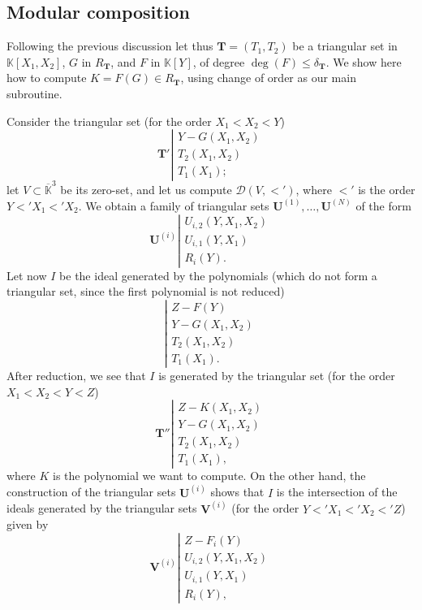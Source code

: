 \documentclass[12pt]{article}
\def\K {\ensuremath{\mathbb{K}}}
\def\Kbar {\ensuremath{\overline{\mathbb{K}}}}
\def\Tt {\ensuremath{\mathbf{T}}}
\def\Uu {\ensuremath{\mathbf{U}}}
\def\Vv {\ensuremath{\mathbf{V}}}
\def\Dr {\ensuremath{\mathscr D}}
\begin{document}
\subsection{Modular composition}



Following the previous discussion let thus $\Tt=(T_1,T_2)$ be a
triangular set in $\K[X_1,X_2]$, $G$ in $R_\Tt$, and $F$ in $\K[Y]$,
of degree $\deg(F) \le \delta_\Tt$. We show here how to compute
$K=F(G) \in R_\Tt$, using change of order as our main subroutine.

Consider the triangular set (for the order $X_1 < X_2< Y$)
\[
\Tt' \left |
  \begin{array}{l}
    Y-G(X_1,X_2)\\
    T_2(X_1,X_2)\\
    T_1(X_1);
  \end{array}\right .
\]
let $V\subset \Kbar^3$ be its zero-set, and let us compute $\Dr(V,
<')$, where $<'$ is the order $Y<'X_1<'X_2$. We obtain a family of
triangular sets $\Uu^{(1)},\dots,\Uu^{(N)}$ of the form
\[
\Uu^{(i)} \left |
  \begin{array}{l}
    U_{i,2}(Y,X_1,X_2)\\
    U_{i,1}(Y,X_1)\\
    R_i(Y).
  \end{array}\right .
\]
Let now $I$ be the ideal generated by the polynomials (which do not
form a triangular set, since the first polynomial is not reduced)
\[
\left |
  \begin{array}{l}
    Z-F(Y)\\
    Y-G(X_1,X_2)\\
    T_2(X_1,X_2)\\
    T_1(X_1).
  \end{array}\right .
\]
After reduction, we see that $I$ is generated by the triangular set
(for the order $X_1 <X_2 < Y <Z$)
\[
\Tt'' \left |
  \begin{array}{l}
    Z-K(X_1,X_2)\\
    Y-G(X_1,X_2)\\
    T_2(X_1,X_2)\\
    T_1(X_1),
  \end{array}\right .
\]
where $K$ is the polynomial we want to compute. On the other hand, the
construction of the triangular sets $\Uu^{(i)}$ shows that $I$ is the
intersection of the ideals
generated by the triangular sets $\Vv^{(i)}$ (for the order $Y <' X_1
<' X_2 <' Z$) given by
\[
\Vv^{(i)} \left |
  \begin{array}{l}
    Z-F_i(Y)\\
    U_{i,2}(Y,X_1,X_2)\\
    U_{i,1}(Y,X_1)\\
    R_i(Y),
  \end{array}\right .
\]
\end{document}
